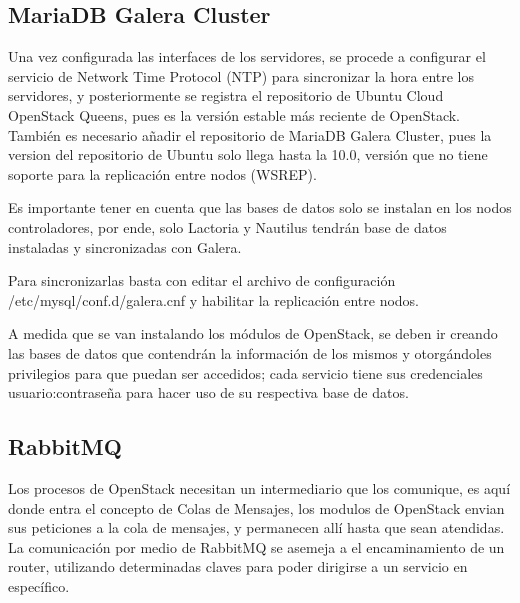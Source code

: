     
    \subsection{MariaDB Galera Cluster}
    
    Una vez configurada las interfaces de los servidores, se procede a configurar el servicio de Network Time Protocol (NTP) para sincronizar la hora entre los servidores, y posteriormente se registra el repositorio de Ubuntu Cloud OpenStack Queens, pues es la versión estable más reciente de OpenStack. También es necesario añadir el repositorio de MariaDB Galera Cluster, pues la version del repositorio de Ubuntu solo llega hasta la 10.0, versión que no tiene soporte para la replicación entre nodos (WSREP).
    
   	Es importante tener en cuenta que las bases de datos solo se instalan en los nodos controladores, por ende, solo Lactoria y Nautilus tendrán base de datos instaladas y sincronizadas con Galera.
    
    Para sincronizarlas basta con editar el archivo de configuración /etc/mysql/conf.d/galera.cnf y habilitar la replicación entre nodos.
   
   
   A medida que se van instalando los módulos de OpenStack, se deben ir creando las bases de datos que contendrán la información de los mismos y otorgándoles privilegios para que puedan ser accedidos; cada servicio tiene sus credenciales usuario:contraseña para hacer uso de su respectiva base de datos.
   
    
    \subsection{RabbitMQ}
    
    Los procesos de OpenStack necesitan un intermediario que los comunique, es aquí donde entra el concepto de Colas de Mensajes, los modulos de OpenStack envian sus peticiones a la cola de mensajes, y permanecen allí hasta que sean atendidas. La comunicación por medio de RabbitMQ se asemeja a el encaminamiento de un router, utilizando determinadas claves para poder dirigirse a un servicio en específico.
    
